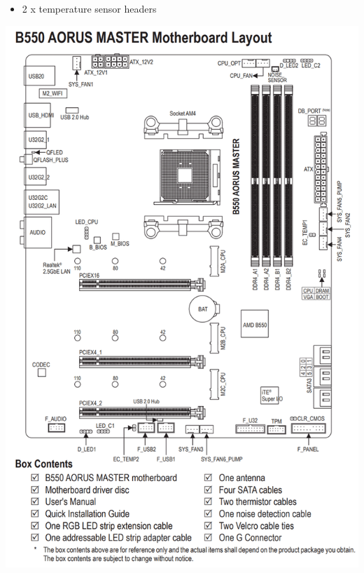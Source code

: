 \documentclass{article}
\begin{document}
\begin{itemize}
\begin{minipage}{0.5\textwidth}
\begin{itemize}
            \item 2 x temperature sensor headers
          \end{itemize}
        \end{minipage}
        \begin{minipage}{\textwidth}
          \includegraphics[scale=0.25]{img/B550AORUSMasterDiagram.png}
        \end{minipage}
      \end{itemize}

  \newpage
\end{document}
